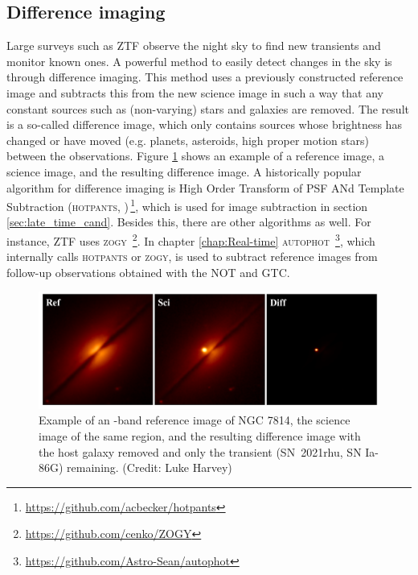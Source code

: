 \documentclass[a4paper,oneside,12pt, class=Latex/Classes/PhDthesisPSnPDF, crop=false]{standalone}
\begin{document}
\subsection{Difference imaging}
Large surveys such as ZTF observe the night sky to find new transients and monitor known ones. A powerful method to easily detect changes in the sky is through difference imaging. This method uses a previously constructed reference image and subtracts this from the new science image in such a way that any constant sources such as (non-varying) stars and galaxies are removed. The result is a so-called difference image, which only contains sources whose brightness has changed or have moved (e.g. planets, asteroids, high proper motion stars) between the observations. Figure \ref{diff_im_example} shows an example of a reference image, a science image, and the resulting difference image. A historically popular algorithm for difference imaging is High Order Transform of PSF ANd Template Subtraction (\textsc{hotpants}, \citealt{HOTPANTS})\,\footnote{\url{https://github.com/acbecker/hotpants}}, which is used for image subtraction in section \ref{sec:late_time_cand}. Besides this, there are other algorithms as well. For instance, ZTF uses \textsc{zogy} \citep{ZOGY}\,\footnote{\url{https://github.com/cenko/ZOGY}}. In chapter \ref{chap:Real-time} \textsc{autophot} \citep{Autophot}\,\footnote{\url{https://github.com/Astro-Sean/autophot}}, which internally calls \textsc{hotpants} or \textsc{zogy}, is used to subtract reference images from follow-up observations obtained with the NOT and GTC.

\begin{figure}
    \centering
    \includegraphics[width=\textwidth]{../Images/chapter_2/diff_im_SN2021rhu.png}
    \caption[Example of a reference, science, and the resulting difference image.]{Example of an \ztfr-band reference image of NGC 7814, the science image of the same region, and the resulting difference image with the host galaxy removed and only the transient (SN~2021rhu, SN Ia-86G) remaining. (Credit: Luke Harvey)}
    \label{diff_im_example}
\end{figure}
\end{document}
